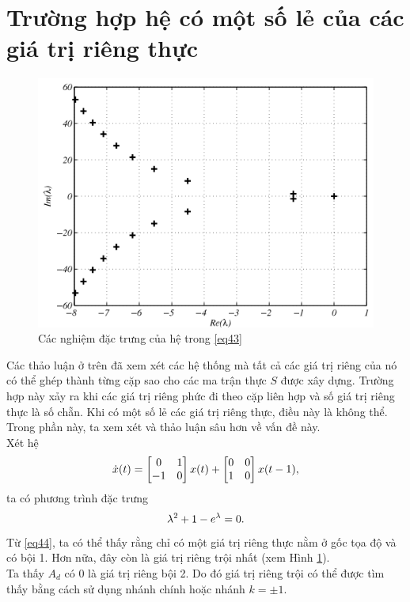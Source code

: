 \section{Trường hợp hệ có một số lẻ của các giá trị riêng thực \label{sec6}}
\begin{figure}[h!]
	\centering
	\includegraphics[scale= 0.7]{"./Hinh/Hinh 3"}
	\caption[Các nghiệm đặc trưng của hệ trong  \eqref{43} ] {Các nghiệm đặc trưng của hệ trong  \eqref{eq43}}
	\label{fig:hinh-3}
\end{figure}
\noindent Các thảo luận ở trên đã xem xét các hệ thống mà tất cả các giá trị riêng của nó có thể ghép thành từng cặp sao cho các ma trận thực $S$ được xây dựng. 
Trường hợp này xảy ra khi các giá trị riêng phức đi theo cặp liên hợp và số giá trị riêng thực là số chẵn. Khi có một số lẻ các giá trị riêng thực, điều này là không thể. Trong phần này, ta xem xét và thảo luận sâu hơn về vấn đề này.\\
Xét hệ
\begin{equation}\label{eq43}
\dot{x}(t) = \begin{bmatrix} 0 & 1\\ - 1 & 0 \end{bmatrix}x(t) + \begin{bmatrix} 0 & 0 \\ 1 & 0 \end{bmatrix}x(t - 1),
\end{equation}
ta có phương trình đặc trưng
\begin{equation}\label{eq44}
	\lambda^2 + 1 - e^{\lambda} = 0.
\end{equation}
Từ \eqref{eq44}, ta có thể thấy rằng chỉ có một giá trị riêng thực nằm ở gốc tọa độ và có bội 1. Hơn nữa, đây còn là giá trị riêng trội nhất (xem Hình \ref{fig:hinh-3}).\\
Ta thấy $A_d$ có $0$ là giá trị riêng bội 2. Do đó giá trị riêng trội có thể được tìm thấy bằng cách sử dụng nhánh chính hoặc nhánh $k = \pm1$.\\
